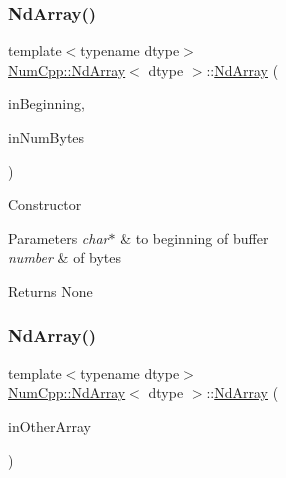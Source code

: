 \subsubsection{\texorpdfstring{Nd\+Array()}{NdArray()}\hspace{0.1cm}{\footnotesize\ttfamily [10/12]}}
{\footnotesize\ttfamily template$<$typename dtype$>$ \\
\mbox{\hyperlink{class_num_cpp_1_1_nd_array}{Num\+Cpp\+::\+Nd\+Array}}$<$ dtype $>$\+::\mbox{\hyperlink{class_num_cpp_1_1_nd_array}{Nd\+Array}} (\begin{DoxyParamCaption}\item[{const dtype $\ast$}]{in\+Beginning,  }\item[{\mbox{\hyperlink{namespace_num_cpp_a36f388e948380413c63011cab9b7fbd5}{uint32}}}]{in\+Num\+Bytes }\end{DoxyParamCaption})\hspace{0.3cm}{\ttfamily [inline]}}

Constructor


\begin{DoxyParams}{Parameters}
{\em char$\ast$} & to beginning of buffer \\
\hline
{\em number} & of bytes \\
\hline
\end{DoxyParams}
\begin{DoxyReturn}{Returns}
None 
\end{DoxyReturn}
\mbox{\label{class_num_cpp_1_1_nd_array_a902791109feab57bb0924909c9cba0b4}} 
\subsubsection{\texorpdfstring{Nd\+Array()}{NdArray()}\hspace{0.1cm}{\footnotesize\ttfamily [11/12]}}
{\footnotesize\ttfamily template$<$typename dtype$>$ \\
\mbox{\hyperlink{class_num_cpp_1_1_nd_array}{Num\+Cpp\+::\+Nd\+Array}}$<$ dtype $>$\+::\mbox{\hyperlink{class_num_cpp_1_1_nd_array}{Nd\+Array}} (\begin{DoxyParamCaption}\item[{const \mbox{\hyperlink{class_num_cpp_1_1_nd_array}{Nd\+Array}}$<$ dtype $>$ \&}]{in\+Other\+Array }\end{DoxyParamCaption})\hspace{0.3cm}{\ttfamily [inline]}}


